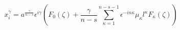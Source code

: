 \begin{equation}
x^{\gamma}_{i}=a^{\frac{\gamma}{n-s}}
\epsilon^{i\gamma}\left(F_{0}(\zeta)+\frac{\gamma}{n-s}
\sum_{\kappa=1}^{n-s-1} \epsilon^{-in\kappa}\mu_{\kappa} l^{\kappa}
F_{\kappa}(\zeta)\right) \label{ns}
\end{equation}

